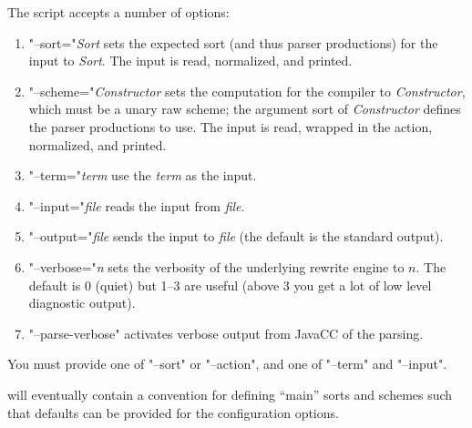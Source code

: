 \documentclass[11pt]{article} %
\begin{document}
\begin{manual}
  The script accepts a number of options:
  \begin{enumerate}

  \item "--sort="\emph{Sort} sets the expected sort (and thus parser productions) for the input to
    \emph{Sort}. The input is read, normalized, and printed.

  \item "--scheme="\emph{Constructor} sets the computation for the compiler to \emph{Constructor},
    which must be a unary raw scheme; the argument sort of \emph{Constructor} defines the parser
    productions to use.  The input is read, wrapped in the action, normalized, and printed.

  \item "--term="\emph{term} use the \emph{term} as the input.

  \item "--input="\emph{file} reads the input from \emph{file}.

  \item "--output="\emph{file} sends the input to \emph{file} (the default is the standard output).

  \item "--verbose="\emph{n} sets the verbosity of the underlying \CRSX rewrite engine to $n$. The
    default is 0 (quiet) but 1--3 are useful (above 3 you get a lot of low level diagnostic output).

  \item "--parse-verbose" activates verbose output from JavaCC of the parsing.

  \end{enumerate}
  You must provide one of "--sort" or "--action", and one of "--term" and "--input".

  \HAX will eventually contain a convention for defining ``main'' sorts and schemes such that
  defaults can be provided for the configuration options.
\end{manual}


\end{document}
